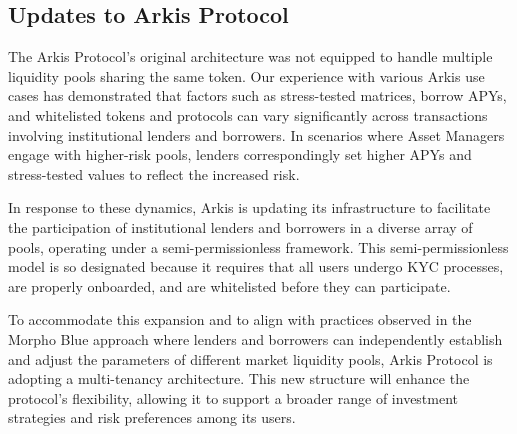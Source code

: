 \documentclass[conference]{IEEEtran}
\begin{document}
\subsection{Updates to Arkis Protocol}

The Arkis Protocol's original architecture was not equipped to handle multiple liquidity pools sharing the same token. Our experience with various Arkis use cases has demonstrated that factors such as stress-tested matrices, borrow APYs, and whitelisted tokens and protocols can vary significantly across transactions involving institutional lenders and borrowers. In scenarios where Asset Managers engage with higher-risk pools, lenders correspondingly set higher APYs and stress-tested values to reflect the increased risk.

In response to these dynamics, Arkis is updating its infrastructure to facilitate the participation of institutional lenders and borrowers in a diverse array of pools, operating under a semi-permissionless framework. This semi-permissionless model is so designated because it requires that all users undergo KYC processes, are properly onboarded, and are whitelisted before they can participate.

To accommodate this expansion and to align with practices observed in the Morpho Blue approach where lenders and borrowers can independently establish and adjust the parameters of different market liquidity pools, Arkis Protocol is adopting a multi-tenancy architecture. This new structure will enhance the protocol’s flexibility, allowing it to support a broader range of investment strategies and risk preferences among its users.\cite{morpho-whitepaper}
\end{document}
